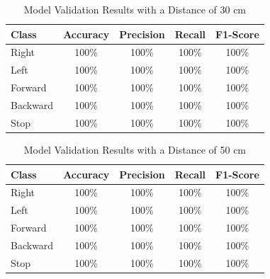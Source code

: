 \begin{table}[ht]
  \caption{Model Validation Results with a Distance of 30 cm}
  \label{tb:30cm}
  \centering
  \begin{tabular}{|l|c|c|c|c|}
  \hline
  \rowcolor[HTML]{C0C0C0} 
  \textbf{Class} & \textbf{Accuracy} & \textbf{Precision} & \textbf{Recall} & \textbf{F1-Score} \\ \hline
  Right    & 100\%            & 100\%             & 100\%           & 100\%            \\ \hline
  Left     & 100\%          & 100\%           & 100\%           & 100\%           \\ \hline
  Forward      & 100\%          & 100\%           & 100\%          & 100\%          \\ \hline
  Backward     & 100\%            & 100\%             & 100\%           & 100\%            \\ \hline
  Stop  & 100\%            & 100\%             & 100\%           & 100\%            \\ \hline
  \end{tabular}
\end{table}

\begin{table}[ht]
  \caption{Model Validation Results with a Distance of 50 cm}
  \label{tb:50cm}
  \centering
  \begin{tabular}{|l|c|c|c|c|}
  \hline
  \rowcolor[HTML]{C0C0C0} 
  \textbf{Class} & \textbf{Accuracy} & \textbf{Precision} & \textbf{Recall} & \textbf{F1-Score} \\ \hline
  Right    & 100\%            & 100\%             & 100\%           & 100\%            \\ \hline
  Left     & 100\%          & 100\%           & 100\%           & 100\%           \\ \hline
  Forward      & 100\%          & 100\%           & 100\%          & 100\%          \\ \hline
  Backward     & 100\%            & 100\%             & 100\%           & 100\%            \\ \hline
  Stop  & 100\%            & 100\%             & 100\%           & 100\%            \\ \hline
  \end{tabular}
\end{table}

